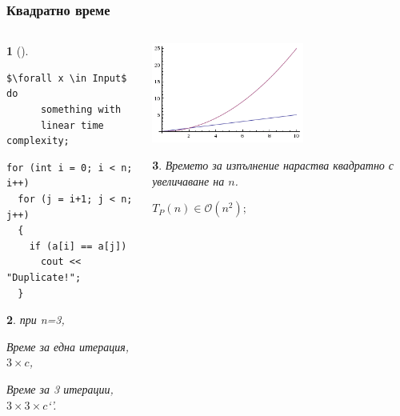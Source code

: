 \documentclass{beamer}
\newtheorem*{remark}{}
\begin{document}
\begin{frame}[fragile]
\frametitle{Квадратно време}


\begin{columns}[t]
  \begin{column}{0.6\textwidth}
\begin{remark}[]
  \begin{lstlisting}[mathescape]
  $\forall x \in Input$ do 
      something with 
      linear time complexity;
  \end{lstlisting}
\end{remark}

\begin{flushleft}
\begin{lstlisting}
for (int i = 0; i < n; i++)
  for (j = i+1; j < n; j++)
  {
    if (a[i] == a[j]) 
      cout << "Duplicate!";
  }
\end{lstlisting}
\end{flushleft}

\begin{remark}
  при n=3,

  Време за една итерация, $3 \times c$,

  Време за 3 итерации, $3\times 3 \times c$`'.
\end{remark}


  \end{column}
  \begin{column}{0.4\textwidth}

   \includegraphics[width=5cm]{images/quadraticf}
    \begin{flushleft}
    \begin{remark}
      Времето за изпълнение нараства квадратно с увеличаване на $n$.

      $T_P(n) \in \mathcal{O}(n^2);$
    \end{remark}
      
    \end{flushleft}


  \end{column}
\end{columns}

\end{frame}
\end{document}
